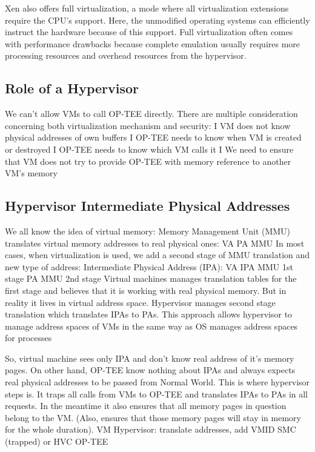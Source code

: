 \documentclass[acmtog]{acmart}
\begin{document}
Xen also offers full virtualization, a mode where all virtualization extensions require the CPU's support. Here, the unmodified operating systems can efficiently instruct the hardware because of this support. Full virtualization often comes with performance drawbacks because complete emulation usually requires more processing resources and overhead resources from the hypervisor.


\subsection{Role of a Hypervisor}
We can’t allow VMs to call OP-TEE directly. There are multiple
consideration concerning both virtualization mechanism and
security:
I VM does not know physical addresses of own buffers
I OP-TEE needs to know when VM is created or destroyed
I OP-TEE needs to know which VM calls it
I We need to ensure that VM does not try to provide OP-TEE
with memory reference to another VM’s memory

\subsection{ Hypervisor Intermediate Physical Addresses}
We all know the idea of virtual memory: Memory Management
Unit (MMU) translates virtual memory addresses to real physical
ones:
VA PA
MMU
In most cases, when virtualization is used, we add a second stage
of MMU translation and new type of address: Intermediate
Physical Address (IPA):
VA IPA
MMU 1st stage
PA
MMU 2nd stage
Virtual machines manages translation tables for the first stage and
believes that it is working with real physical memory. But in reality
it lives in virtual address space. Hypervisor manages second stage
translation which translates IPAs to PAs.
This approach allows hypervisor to manage address spaces of VMs
in the same way as OS manages address spaces for processes

So, virtual machine sees only IPA and don’t know real address of
it’s memory pages. On other hand, OP-TEE know nothing about
IPAs and always expects real physical addresses to be passed from
Normal World.
This is where hypervisor steps is. It traps all calls from VMs to
OP-TEE and translates IPAs to PAs in all requests. In the
meantime it also ensures that all memory pages in question belong
to the VM. (Also, ensures that those memory pages will stay in
memory for the whole duration).
VM
Hypervisor: translate addresses, add VMID
SMC (trapped) or HVC
OP-TEE
\end{document}
